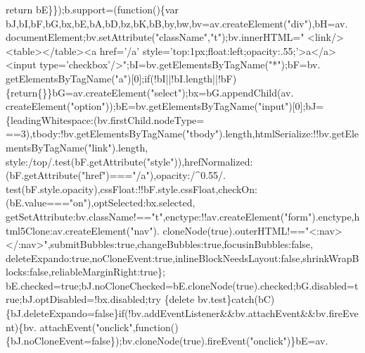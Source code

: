 \begin{DoxyCode}
{      return} bE\}\});b.support=(\textcolor{keyword}{function}()\{var bJ,bI,bF,bG,bx,bE,bA,bD,bz,bK,bB,by,bw,bv=av.createElement(\textcolor{stringliteral}{"div"}),bH=av.
      documentElement;bv.setAttribute(\textcolor{stringliteral}{"className"},\textcolor{stringliteral}{"t"});bv.innerHTML=\textcolor{stringliteral}{"   <link/><table></table><a href='/a'
       style='top:1px;float:left;opacity:.55;'>a</a><input type='checkbox'/>"};bI=bv.getElementsByTagName(\textcolor{stringliteral}{"*"});bF=bv.
      getElementsByTagName(\textcolor{stringliteral}{"a"})[0];\textcolor{keywordflow}{if}(!bI||!bI.length||!bF)\{\textcolor{keywordflow}{return}\{\}\}bG=av.createElement(\textcolor{stringliteral}{"select"});bx=bG.appendChild(av.
      createElement(\textcolor{stringliteral}{"option"}));bE=bv.getElementsByTagName(\textcolor{stringliteral}{"input"})[0];bJ=\{leadingWhitespace:(bv.firstChild.nodeType=
      ==3),tbody:!bv.getElementsByTagName(\textcolor{stringliteral}{"tbody"}).length,htmlSerialize:!!bv.getElementsByTagName(\textcolor{stringliteral}{"link"}).length,
      style:/top/.test(bF.getAttribute(\textcolor{stringliteral}{"style"})),hrefNormalized:(bF.getAttribute(\textcolor{stringliteral}{"href"})===\textcolor{stringliteral}{"/a"}),opacity:/^0.55/.
      test(bF.style.opacity),cssFloat:!!bF.style.cssFloat,checkOn:(bE.value===\textcolor{stringliteral}{"on"}),optSelected:bx.selected,
      getSetAttribute:bv.className!==\textcolor{stringliteral}{"t"},enctype:!!av.createElement(\textcolor{stringliteral}{"form"}).enctype,html5Clone:av.createElement(\textcolor{stringliteral}{"nav"}).
      cloneNode(\textcolor{keyword}{true}).outerHTML!==\textcolor{stringliteral}{"<:nav></:nav>"},submitBubbles:\textcolor{keyword}{true},changeBubbles:\textcolor{keyword}{true},focusinBubbles:\textcolor{keyword}{false},
      deleteExpando:\textcolor{keyword}{true},noCloneEvent:\textcolor{keyword}{true},inlineBlockNeedsLayout:\textcolor{keyword}{false},shrinkWrapBlocks:\textcolor{keyword}{false},reliableMarginRight:\textcolor{keyword}{true}\};
      bE.checked=\textcolor{keyword}{true};bJ.noCloneChecked=bE.cloneNode(\textcolor{keyword}{true}).checked;bG.disabled=\textcolor{keyword}{true};bJ.optDisabled=!bx.disabled;\textcolor{keywordflow}{try}
      \{\textcolor{keyword}{delete} bv.test\}\textcolor{keywordflow}{catch}(bC)\{bJ.deleteExpando=\textcolor{keyword}{false}\}\textcolor{keywordflow}{if}(!bv.addEventListener&&bv.attachEvent&&bv.fireEvent)\{bv.
      attachEvent(\textcolor{stringliteral}{"onclick"},\textcolor{keyword}{function}()\{bJ.noCloneEvent=\textcolor{keyword}{false}\});bv.cloneNode(\textcolor{keyword}{true}).fireEvent(\textcolor{stringliteral}{"onclick"})\}bE=av.

\end{DoxyCode}
